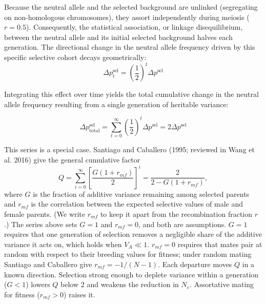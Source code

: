 \documentclass[12pt]{article}
\begin{document}
Because the neutral allele and the selected background are unlinked (segregating on non-homologous chromosomes), they assort independently during meiosis ($r = 0.5$). Consequently, the statistical association, or linkage disequilibrium, between the neutral allele and its initial selected background halves each generation. The directional change in the neutral allele frequency driven by this specific selective cohort decays geometrically:
\begin{equation}
    \Delta p_t^{\text{sel}} = \left(\frac{1}{2}\right)^t \Delta p^{\text{sel}}
\end{equation}

Integrating this effect over time yields the total cumulative change in the neutral allele frequency resulting from a single generation of heritable variance:

\begin{equation}
    \Delta p_{\text{total}}^{\text{sel}} = \sum_{t=0}^{\infty} \left(\frac{1}{2}\right)^t \Delta p^{\text{sel}} = 2 \Delta p^{\text{sel}}
\end{equation}

This series is a special case. Santiago and Caballero (1995; reviewed in Wang et al. 2016) give the general cumulative factor
\begin{equation}
    Q = \sum_{i=0}^{\infty} \left[\frac{G(1+r_{mf})}{2}\right]^i = \frac{2}{2 - G(1+r_{mf})},
\end{equation}
where $G$ is the fraction of additive variance remaining among selected parents and $r_{mf}$ is the correlation between the expected selective values of male and female parents. (We write $r_{mf}$ to keep it apart from the recombination fraction $r$.) The series above sets $G = 1$ and $r_{mf} = 0$, and both are assumptions. $G = 1$ requires that one generation of selection removes a negligible share of the additive variance it acts on, which holds when $V_A \ll 1$. $r_{mf} = 0$ requires that mates pair at random with respect to their breeding values for fitness; under random mating Santiago and Caballero give $r_{mf} = -1/(N-1)$. Each departure moves $Q$ in a known direction. Selection strong enough to deplete variance within a generation ($G < 1$) lowers $Q$ below 2 and weakens the reduction in $N_e$. Assortative mating for fitness ($r_{mf} > 0$) raises it.
\end{document}
